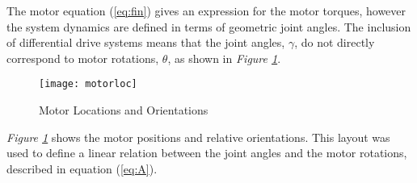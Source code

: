 The motor equation (\ref{eq:fin}) gives an expression for the motor torques, however the system dynamics are defined in terms of geometric joint angles. The inclusion of differential drive systems means that the joint angles, $\gamma$, do not directly correspond to motor rotations, $\theta$, as shown in \emph{Figure \ref{fig:motorloc}}.


\begin{figure}[htp]
  \center
  \texttt{[image: motorloc]}
  \caption{Motor Locations and Orientations}
  \label{fig:motorloc}
\end{figure}

\emph{Figure \ref{fig:motorloc}} shows the motor positions and relative orientations.
This layout was used to define a linear relation between the joint angles and the motor rotations, described in equation (\ref{eq:A}).

